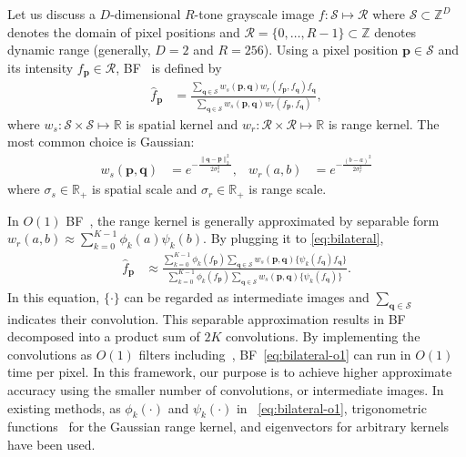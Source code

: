 \documentclass{article}
\begin{document}
Let us discuss a $D$-dimensional $R$-tone grayscale image $f:\mathcal{S}\mapsto\mathcal{R}$ where $\mathcal{S}\subset\mathbb{Z}^D$ denotes the domain of pixel positions and $\mathcal{R}=\{0,\ldots,R-1\}\subset\mathbb{Z}$ denotes dynamic range (generally, $D=2$ and $R=256$). Using a pixel position $\bm{p}\in\mathcal{S}$ and its intensity $f_{\bm{p}}\in\mathcal{R}$, BF~\cite{tomasi1998bilateral} is defined by
\vspace{-1mm}
\begin{align}
    \hat{f}_{\bm{p}} &= \frac{
        \sum_{\bm{q}\in\mathcal{S}} w_s(\bm{p},\bm{q})w_r(f_{\bm{p}},f_{\bm{q}})f_{\bm{q}}
    }{
        \sum_{\bm{q}\in\mathcal{S}} w_s(\bm{p},\bm{q})w_r(f_{\bm{p}},f_{\bm{q}})
    }, \label{eq:bilateral}
\end{align}
where $w_s:\mathcal{S}\times\mathcal{S}\mapsto\mathbb{R}$ is spatial kernel and $w_r:\mathcal{R}\times\mathcal{R}\mapsto\mathbb{R}$ is range kernel.
The most common choice is Gaussian:
\vspace{-1mm}
\begin{align}
    w_s(\bm{p},\bm{q}) &= e^{-\frac{\| \bm{q}-\bm{p} \|_2^2}{2\sigma_s^2}}, &
    w_r(a,b) &= e^{-\frac{\left( b-a \right)^2}{2\sigma_r^2}}
\label{eq:kernels}
\end{align}
where $\sigma_s\in\mathbb{R}_+$ is spatial scale and $\sigma_r\in\mathbb{R}_+$ is range scale.

In $O(1)$ BF~\cite{sugimoto2015compressive,deng2017fast,sugimoto2016consant,papari2017fast}, the range kernel is generally approximated by separable form $w_r(a,b) \approx \sum_{k=0}^{K-1} \phi_k(a) \psi_k(b)$. By plugging it to \eqref{eq:bilateral},
\vspace{-1mm}
\begin{align}
    \hat{f}_{\bm{p}}\!&\approx\!\frac{
        \sum_{k=0}^{K-1} \phi_k(f_{\bm{p}})
        \sum_{\bm{q}\in\mathcal{S}} w_s(\bm{p},\bm{q}) \{ \psi_k(f_{\bm{q}}) f_{\bm{q}} \}
    }{
        \sum_{k=0}^{K-1} \phi_k(f_{\bm{p}}) 
        \sum_{\bm{q}\in\mathcal{S}} w_s(\bm{p},\bm{q}) \{ \psi_k(f_{\bm{q}}) \}
    }.
\label{eq:bilateral-o1}
\end{align}
In this equation, $\{\cdot\}$ can be regarded as intermediate images and $\sum_{\bm{q}\in\mathcal{S}}$ indicates their convolution.
This separable approximation results in BF decomposed into a product sum of $2K$ convolutions.
By implementing the convolutions as $O(1)$ filters including~\cite{sugimoto2013fast,sugimoto2015efficient,sugimoto2018universal},
BF~\eqref{eq:bilateral-o1} can run in $O(1)$ time per pixel.
In this framework, our purpose is to achieve higher approximate accuracy using the smaller number of convolutions, or intermediate images.
In existing methods, as $\phi_k(\cdot)$ and $\psi_k(\cdot)$ in ~\eqref{eq:bilateral-o1}, trigonometric functions~\cite{sugimoto2015compressive,deng2017fast} for the Gaussian range kernel, and eigenvectors for arbitrary kernels~\cite{sugimoto2016consant,papari2017fast} have been used.
\end{document}
